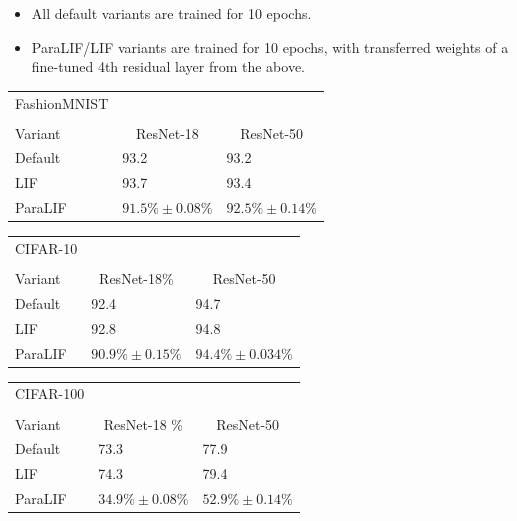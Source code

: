 \documentclass[conference]{IEEEtran}
\begin{document}
\begin{itemize}
    \item All default variants are trained for 10 epochs.
    \item ParaLIF/LIF variants are trained for 10 epochs, with transferred weights of a fine-tuned 4th residual layer from the above.
\end{itemize}

\pagebreak

\begin{table}[ht]
\centering
\begin{tabular}{ l l l }
  FashionMNIST \\
  \\
  Variant & \multicolumn{1}{c}{ResNet-18} & \multicolumn{1}{c}{ResNet-50} \\
  \midrule
  Default & \num{93.2} & \num{93.2} \\
  LIF & \num{93.7} & \num{93.4} \\
  ParaLIF & $91.5\% \pm 0.08\%$ & $92.5\% \pm 0.14\%$ \\
  \bottomrule
\end{tabular}
\end{table}

\begin{table}[ht]
\centering
\begin{tabular}{ l l l }
  CIFAR-10 \\
  \\
  Variant & \multicolumn{1}{c}{ResNet-18\%} & \multicolumn{1}{c}{ResNet-50} \\
  \midrule
  Default & \num{92.4} & \num{94.7} \\
  LIF & \num{92.8} & \num{94.8} \\
  ParaLIF & $90.9\% \pm 0.15\%$ & $94.4\% \pm 0.034\%$ \\
  \bottomrule
\end{tabular}
\end{table}

\begin{table}[ht]
\centering
\begin{tabular}{ l l l }
  CIFAR-100 \\
  \\
  Variant & \multicolumn{1}{c}{ResNet-18 \%} & \multicolumn{1}{c}{ResNet-50} \\
  \midrule
  Default & \num{73.3} & \num{77.9} \\
  LIF & \num{74.3} & \num{79.4} \\
  ParaLIF & $34.9\% \pm 0.08\%$ & $52.9\% \pm 0.14\%$ \\
  \bottomrule
\end{tabular}
\end{table}
\end{document}

